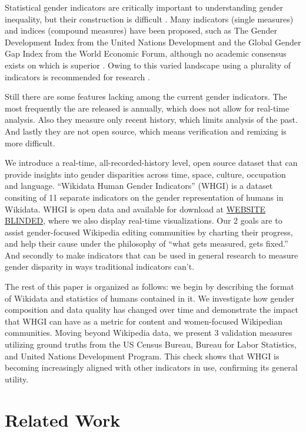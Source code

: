 \documentclass{sig-alternate-05-2015}
\begin{document}
Statistical gender indicators are critically important to understanding gender inequality, but their construction is difficult \cite{klasen_gender-related_2004}. Many indicators (single measures) and indices (compound measures) have been proposed, such as The Gender Development Index from the United Nations Development and the Global Gender Gap Index from the World Economic Forum, although no academic consensus exists on which is superior \cite{hawken_cross-national_2012}. Owing to this varied landscape using a plurality of indicators is recommended for research \cite{jutting_measuring_2008}.

Still there are some features lacking among the current gender indicators. The most frequently the are released is annually, which does not allow for real-time analysis. Also they measure only recent history, which limits analysis of the past. And lastly they are not open source, which means verification and remixing is more difficult. 

We introduce a real-time, all-recorded-history level, open source dataset that can provide insights into gender disparities across time, space, culture, occupation and language. ``Wikidata Human Gender Indicators'' (WHGI) is a dataset consiting  of 11 separate indicators on the gender representation of humans in Wikidata. WHGI is open data and available for download at \url{WEBSITE BLINDED}, where we also display real-time visualizations. Our 2 goals are to assist gender-focused Wikipedia editing communities by charting their progress, and help their cause under the philosophy of ``what gets measured, gets fixed.''  And secondly to make indicators that can be used in general research to measure gender disparity in ways traditional indicators can't.

The rest of this paper is organized as follows: we begin by describing the format of Wikidata and stat\-istics of humans contained in it. We investigate how gender composition and data quality has changed over time and demonstrate the impact that WHGI can have as a metric for content and women-focused Wikipedian communities.  
Moving beyond Wikipedia data, we present 3 validation measures utilizing ground truths from the US Census Bureau, Bureau for Labor Statistics, and United Nations Development Program. This check shows that WHGI is becoming increasingly aligned with other indicators in use, confirming its general utility.

\section{Related Work}
\end{document}

